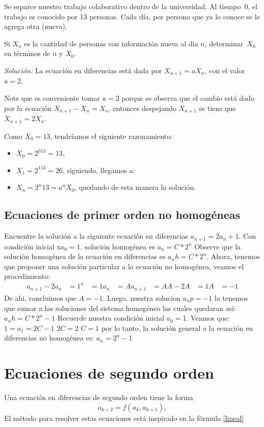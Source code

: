 \documentclass{report}
\begin{document}
Se esparce nuestro trabajo colaborativo dentro de la universidad. Al
tiempo~0, el trabajo es conocido por 13 personas. Cada día, por
persona que ya lo conoce se le agrega otra (nueva).

Si $X_n$ es la cantidad de personas con información nueva al día $n$,
determinar~$X_n$ en términos de $n$ y $X_0$.

\textit{Solución:} La ecuación en diferencias está dada por
$X_{n+1}=aX_n$, con el valor~$a=2$.

Note que es conveniente tomar $a=2$ porque se observa que el cambio
está dado por la ecuación $X_{n+1}-X_{n}=X_{n}$, entonces despejando
$X_{n+1}$ se tiene que~$X_{n+1}=2X_n$.

Como $X_0=13$, tendríamos el siguiente razonamiento:
\begin{itemize}
\item $X_0=2^013=13$,
\item $X_1=2^113=26$, siguiendo, llegamos a:
\item $X_n=2^n13=a^nX_0$, quedando de esta manera la solución.
\end{itemize}


\section{Ecuaciones de primer orden no homogéneas}
Encuentre la solución a la siguiente ecuación en diferencias $a_{n+1}=2a_{n}+1$. Con condición inicial x$a_{0}=1$.
solución homogénea es $a_{n}=C*2^n$
Observe que la solución homogénea de la ecuación en diferencias  es $a_{n}h=C*2^n$.
Ahora, tenemos que proponer una solución particular a la ecuación no homogénea, veamos el procedimiento:
\begin{align*}
  a_{n+1}-2a_{n}&=1^n&=1
  a_{n}&=A
  a_{n+1}&=A
  A-2A&=1
  A&=-1
\end{align*}
De ahi, concluimos que $A=-1$.
Luego, nuestra solucion $a_np=-1$ la tenemos que sumar a las soluciones del sistema homogéneo las cuales quedaran así:
$a_{n}h=C*2^n-1$
Recuerde nuestra condición inicial $a_{0}=1$. Veamos que:
$1=a_{1}=2C-1$
$2C=2$
$C=1$
por lo tanto, la solución general a la ecuación en diferencias no homogénea es:
$a_{n}=2^n-1$


\chapter{Ecuaciones de segundo orden}

Una ecuación en diferencias de segundo orden tiene la forma
\begin{equation}
  \label{ecsegorden1}
  a_{k+2}=f(a_k,a_{k+1}),
\end{equation}
El método para resolver estas ecuaciones está inspirado en la fórmula \eqref{lineal} 
\end{document}
